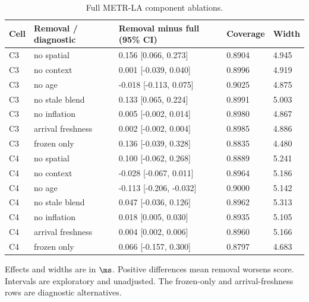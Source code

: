 \begin{table}[p]
\caption{Full METR-LA component ablations.}\label{tab:ablation-metr}
\centering\small
\begin{tabular}{lllll}\toprule
Cell & Removal / diagnostic & Removal minus full (95\% CI) & Coverage & Width \\\midrule
C3 & no spatial & 0.156 [0.066, 0.273] & 0.8904 & 4.945 \\
C3 & no context & 0.001 [-0.039, 0.040] & 0.8996 & 4.919 \\
C3 & no age & -0.018 [-0.113, 0.075] & 0.9025 & 4.875 \\
C3 & no stale blend & 0.133 [0.065, 0.224] & 0.8991 & 5.003 \\
C3 & no inflation & 0.005 [-0.002, 0.014] & 0.8980 & 4.867 \\
C3 & arrival freshness & 0.002 [-0.002, 0.004] & 0.8985 & 4.886 \\
C3 & frozen only & 0.136 [-0.039, 0.328] & 0.8835 & 4.480 \\
C4 & no spatial & 0.100 [-0.062, 0.268] & 0.8889 & 5.241 \\
C4 & no context & -0.028 [-0.067, 0.011] & 0.8964 & 5.186 \\
C4 & no age & -0.113 [-0.206, -0.032] & 0.9000 & 5.142 \\
C4 & no stale blend & 0.047 [-0.036, 0.126] & 0.8962 & 5.313 \\
C4 & no inflation & 0.018 [0.005, 0.030] & 0.8935 & 5.105 \\
C4 & arrival freshness & 0.004 [0.002, 0.006] & 0.8960 & 5.166 \\
C4 & frozen only & 0.066 [-0.157, 0.300] & 0.8797 & 4.683 \\
\bottomrule\end{tabular}
\par\smallskip\footnotesize Effects and widths are in $\ms$. Positive differences mean removal worsens score. Intervals are exploratory and unadjusted. The frozen-only and arrival-freshness rows are diagnostic alternatives.
\end{table}\clearpage
